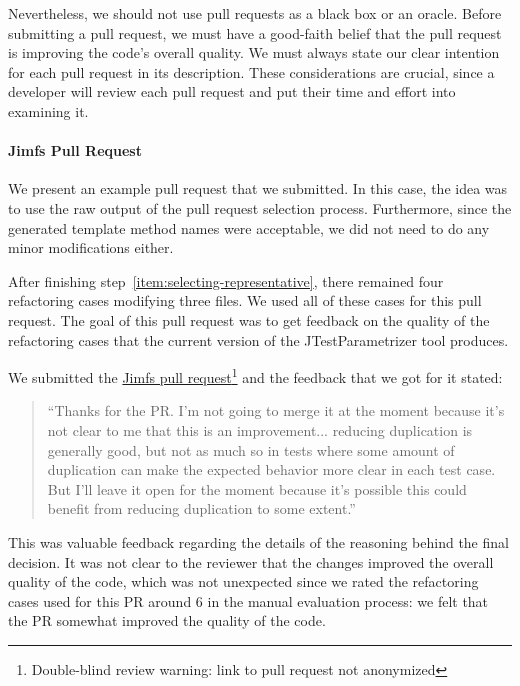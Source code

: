 
Nevertheless, we should not use pull requests as a black box or an oracle. Before submitting a pull request, we must have a good-faith belief that the pull request is improving the code's overall quality. We must always state our clear intention for each pull request in its description. These considerations are crucial, since a developer will review each pull request and put their time and effort into examining it. 

\paragraph{Jimfs Pull Request}
We present an example pull request that we submitted. In this case, the idea was to use the raw output of the pull request selection process. Furthermore, since the generated template method names were acceptable, we did not need to do any minor modifications either.

After finishing step~\ref{item:selecting-representative}, there remained four refactoring cases modifying three files. We used all of these cases for this pull request. The goal of this pull request was to get feedback on the quality of the refactoring cases that the current version of the JTestParametrizer tool produces.

We submitted the \href{https://github.com/google/jimfs/pull/159}{Jimfs pull request}\footnote{Double-blind review warning: link to pull request not anonymized} and the feedback that we got for it stated: \begin{quote}``Thanks for the PR. I'm not going to merge it at the moment because it's not clear to me that this is an improvement... reducing duplication is generally good, but not as much so in tests where some amount of duplication can make the expected behavior more clear in each test case. But I'll leave it open for the moment because it's possible this could benefit from reducing duplication to some extent.''\end{quote}

This was valuable feedback regarding the details of the reasoning behind the final decision. It was not clear to the reviewer that the changes improved the overall quality of the code, which was not unexpected since we rated the refactoring cases used for this PR around 6 in the manual evaluation process: we felt that the PR somewhat improved the quality of the code. 

